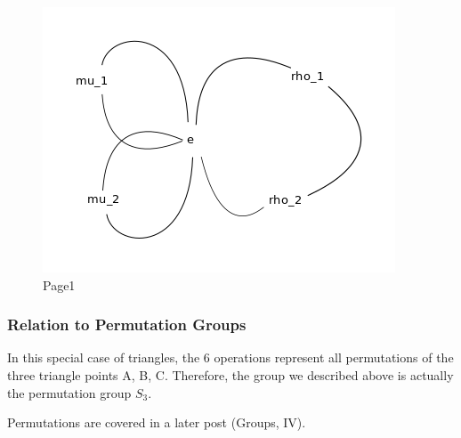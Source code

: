 \begin{figure}
\centering
\includegraphics[scale=0.7]{images/groups_02_4.png}
\caption{Page1}
\end{figure}

\subsubsection{Relation to Permutation
Groups}\label{relation-to-permutation-groups}

In this special case of triangles, the 6 operations represent all
permutations of the three triangle points A, B, C. Therefore, the group
we described above is actually the permutation group \(S_3\).

Permutations are covered in a later post (Groups, IV).

